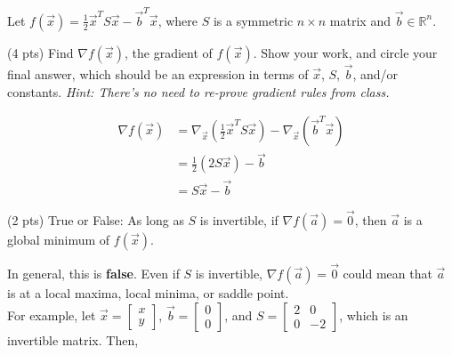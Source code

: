 \documentclass[11pt]{article}
\begin{document}
\begin{prob}
Let $\displaystyle f(\vec x) = \frac{1}{2} \vec x^T S \vec x - \vec b^T \vec x$, where $S$ is a symmetric $n \times n$ matrix and $\vec b \in \mathbb{R}^n$.

\begin{subprob}(4 pts) Find $\nabla f(\vec x)$, the gradient of $f(\vec x)$. Show your work, and $\boxed{\text{circle}}$ your final answer, which should be an expression in terms of $\vec x$, $S$, $\vec b$, and/or constants. \textit{Hint: There's no need to re-prove gradient rules from class.}

\emptybox{3cm}

\begin{solution}
\begin{align*}
\nabla f(\vec x) &= \nabla_{\vec x}\left(\frac{1}{2} \vec x^T S \vec x\right) - \nabla_{\vec x}\left(\vec b^T \vec x\right)
\\ &= \frac{1}{2}(2S \vec x) - \vec b
\\ &= \boxed{S\vec x - \vec b}
\end{align*}
\end{solution}
\end{subprob}

\begin{subprob}(2 pts) True or False: As long as $S$ is invertible, if $\nabla f(\vec a) = \vec 0$, then $\vec a$ is a global minimum of $f(\vec x)$.

 

\vspace{-0.1in}

\begin{solution}
In general, this is \textbf{false}. Even if $S$ is invertible, $\nabla f(\vec a) = \vec 0$ could mean that $\vec a$ is at a local maxima, local minima, or saddle point. \\

For example, let $\vec x = \begin{bmatrix} x \\ y \end{bmatrix}$, $\vec b = \begin{bmatrix} 0 \\ 0 \end{bmatrix}$, and $S = \begin{bmatrix} 2 & 0 \\ 0 & -2 \end{bmatrix}$, which is an invertible matrix. Then,


\end{solution}
\end{subprob}
\end{prob}
\end{document}
